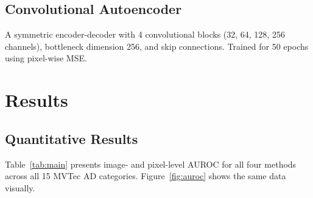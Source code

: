 \documentclass[11pt,letterpaper]{article}
\newcommand{\auroc}{\textsc{AUROC}}
\begin{document}
\subsection{Convolutional Autoencoder}
A symmetric encoder-decoder with 4 convolutional blocks (32, 64, 128, 256 channels),
bottleneck dimension 256, and skip connections. Trained for 50 epochs using pixel-wise MSE.

\section{Results}
\label{sec:results}

\subsection{Quantitative Results}

Table~\ref{tab:main} presents image- and pixel-level \auroc{} for all four methods across
all 15 MVTec AD categories. Figure~\ref{fig:auroc} shows the same data visually.
\end{document}
